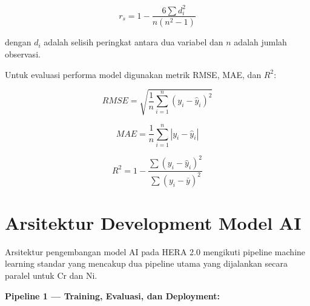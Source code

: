 \documentclass[12pt,a4paper]{article}
\begin{document}
\begin{equation}
r_s = 1 - \frac{6\sum d_i^2}{n(n^2-1)}
\end{equation}

dengan $d_i$ adalah selisih peringkat antara dua variabel dan $n$ adalah jumlah observasi.

Untuk evaluasi performa model digunakan metrik RMSE, MAE, dan $R^2$:

\begin{equation}
RMSE = \sqrt{\frac{1}{n}\sum_{i=1}^{n}(y_i - \hat{y}_i)^2}
\end{equation}

\begin{equation}
MAE = \frac{1}{n}\sum_{i=1}^{n}|y_i - \hat{y}_i|
\end{equation}

\begin{equation}
R^2 = 1 - \frac{\sum (y_i-\hat{y}_i)^2}{\sum (y_i-\bar{y})^2}
\end{equation}


\section{Arsitektur Development Model AI}

Arsitektur pengembangan model AI pada HERA 2.0 mengikuti pipeline machine learning standar yang mencakup dua pipeline utama yang dijalankan secara paralel untuk Cr dan Ni.

\textbf{Pipeline 1 --- Training, Evaluasi, dan Deployment:}
\end{document}
